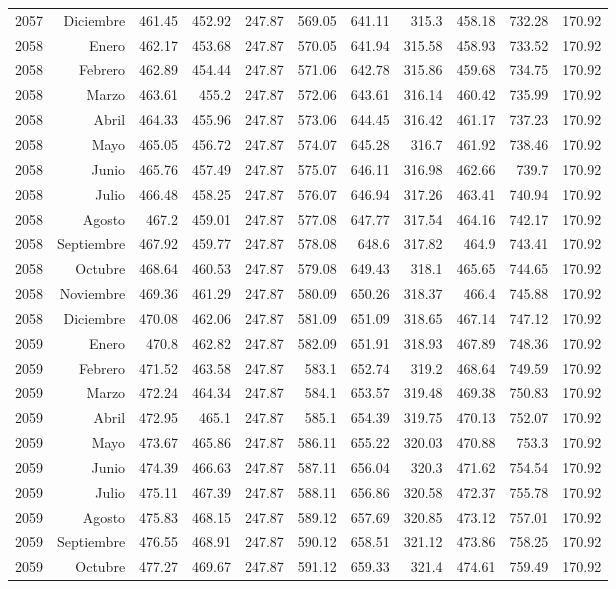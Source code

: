 \documentclass{article}%
\begin{document}
\begin{longtable}{|l r|r|r|r|r|r|r|r|r|r|}
2057&Diciembre&461.45&452.92&247.87&569.05&641.11&315.3&458.18&732.28&170.92\\%
2058&Enero&462.17&453.68&247.87&570.05&641.94&315.58&458.93&733.52&170.92\\%
2058&Febrero&462.89&454.44&247.87&571.06&642.78&315.86&459.68&734.75&170.92\\%
2058&Marzo&463.61&455.2&247.87&572.06&643.61&316.14&460.42&735.99&170.92\\%
2058&Abril&464.33&455.96&247.87&573.06&644.45&316.42&461.17&737.23&170.92\\%
2058&Mayo&465.05&456.72&247.87&574.07&645.28&316.7&461.92&738.46&170.92\\%
2058&Junio&465.76&457.49&247.87&575.07&646.11&316.98&462.66&739.7&170.92\\%
2058&Julio&466.48&458.25&247.87&576.07&646.94&317.26&463.41&740.94&170.92\\%
2058&Agosto&467.2&459.01&247.87&577.08&647.77&317.54&464.16&742.17&170.92\\%
2058&Septiembre&467.92&459.77&247.87&578.08&648.6&317.82&464.9&743.41&170.92\\%
2058&Octubre&468.64&460.53&247.87&579.08&649.43&318.1&465.65&744.65&170.92\\%
2058&Noviembre&469.36&461.29&247.87&580.09&650.26&318.37&466.4&745.88&170.92\\%
2058&Diciembre&470.08&462.06&247.87&581.09&651.09&318.65&467.14&747.12&170.92\\%
2059&Enero&470.8&462.82&247.87&582.09&651.91&318.93&467.89&748.36&170.92\\%
2059&Febrero&471.52&463.58&247.87&583.1&652.74&319.2&468.64&749.59&170.92\\%
2059&Marzo&472.24&464.34&247.87&584.1&653.57&319.48&469.38&750.83&170.92\\%
2059&Abril&472.95&465.1&247.87&585.1&654.39&319.75&470.13&752.07&170.92\\%
2059&Mayo&473.67&465.86&247.87&586.11&655.22&320.03&470.88&753.3&170.92\\%
2059&Junio&474.39&466.63&247.87&587.11&656.04&320.3&471.62&754.54&170.92\\%
2059&Julio&475.11&467.39&247.87&588.11&656.86&320.58&472.37&755.78&170.92\\%
2059&Agosto&475.83&468.15&247.87&589.12&657.69&320.85&473.12&757.01&170.92\\%
2059&Septiembre&476.55&468.91&247.87&590.12&658.51&321.12&473.86&758.25&170.92\\%
2059&Octubre&477.27&469.67&247.87&591.12&659.33&321.4&474.61&759.49&170.92\\%

\end{longtable}
\end{document}
